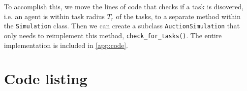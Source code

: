 \documentclass[11pt]{article}
\begin{document}
        To accomplish this, we move the lines of code that checks if a task is 
        disovered, i.e. an agent is within task radius $T_r$ of the tasks, to a
        separate method within the \lstinline|Simulation| class. Then we can 
        create a subclass \lstinline|AuctionSimulation| that only needs to 
        reimplement this method, \lstinline|check_for_tasks()|. The entire implementation is 
        included in \autoref{app:code}.

\printbibliography

\pagebreak

\appendix
\section{Code listing}
\label{app:code}


\end{document}
